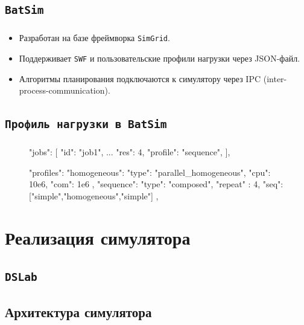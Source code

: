 \documentclass[t]{beamer}  %
\begin{document}
	\subsection{\texttt{BatSim}}

	\begin{frame}[fragile]
		\frametitle{\insertsection} 
		\framesubtitle{\insertsubsection}
		\vspace{1cm}	
		\begin{itemize}
			\item Разработан на базе фреймворка \texttt{SimGrid}.
			\item Поддерживает \texttt{SWF} и пользовательские профили нагрузки через JSON-файл.
			\item Алгоритмы планирования подключаются к симулятору через IPC (inter-process-communication).
		\end{itemize}
		\end{frame}

	\subsection{\texttt{Профиль нагрузки в BatSim}}
	\begin{frame}[fragile]
		\frametitle{\insertsection} 
		\framesubtitle{\insertsubsection}
		\begin{figure}
			\scriptsize
		\begin{jsoncode}
"jobs": [
  {"id": "job1",  ...  "res": 4, "profile": "sequence"},
],

"profiles": {
  "homogeneous": {
    "type": "parallel_homogeneous",
    "cpu": 10e6,
    "com": 1e6
  },
  "sequence": {
    "type": "composed",
    "repeat" : 4,
    "seq": ["simple","homogeneous","simple"]
  },
}
		\end{jsoncode}
	\end{figure}
	\end{frame}


	\section{Реализация симулятора}
	\subsection{\texttt{DSLab}}





	\subsection{Архитектура симулятора}
\end{document}
